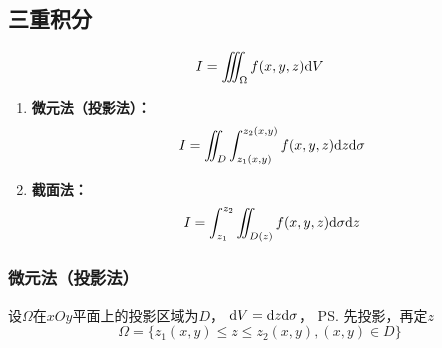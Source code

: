 \begin{center}
\end{center}

\subsection{三重积分}

$${I=\iiint_{\Omega}f(x,y,z)\mathrm{d} V}$$
\begin{enumerate}
  \item {\bf 微元法（投影法）：}
  $$I=\iint_D\int_{z_1(x,y)}^{z_2(x,y)}f(x,y,z)\mathrm{d} z\mathrm{d}\sigma$$
  \item {\bf 截面法：}
  $$I=\int_{z_1}^{z_2}\iint_{D(z)}f(x,y,z)\mathrm{d}\sigma \mathrm{d} z$$
\end{enumerate}

\subsubsection{微元法（投影法）}

设$\Omega$在$xOy$平面上的投影区域为$D$， $\mathrm{d} V=\mathrm{d} z\mathrm{d}\sigma$， \ps{先投影，再定$z$}
$$\Omega=\{z_1(x,y)\leq z\leq z_2(x,y), (x,y)\in D\}$$

